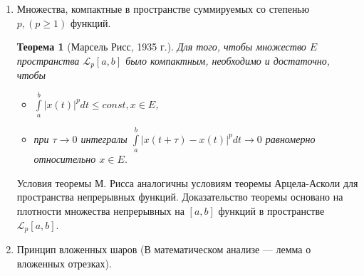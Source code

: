 \documentclass[12pt,a4paper,titlepage,oneside]{book}
\newcommand{\overbar}[1]{\mkern 1.5mu\overline{\mkern-1.5mu#1\mkern-1.5mu}\mkern 1.5mu}
\theoremstyle{definition}
\theoremstyle{plain}
\newtheorem*{theorem}{Теорема}
\theoremstyle{remark}
\theoremstyle{remark}
\theoremstyle{remark}
\theoremstyle{remark}
\theoremstyle{plain}
\theoremstyle{plain}
\begin{document}
\begin{enumerate}
\begin{proof}
	Покажем, что компактное множество $H_{\varepsilon}$ образует в $E$ $\varepsilon$-сеть. Для любой функции $x\in E$ построим ломаную $\overbar{x}(t)$, $\overbar{x} \in H_{\varepsilon}$. Так как $x(t)$ непрерывна, то на отрезке $[t_k, t_{k+1}]$ она достигает своего максимального значения $M_k$ и своего минимального значения $m_k$: $m_k \leqslant x(t) \leqslant M_k, t \in [t_k, t_{k+1}]$. В этих же пределах лежат и значения линейной функции $\overbar{x}(t)$. Ясно, что $|x(t)-\overbar{x}(t)|\leqslant M_k-m_k, t \in [t_k, t_{k+1}]$.
	
	В силу выбора значения $\delta$ величины $M_k-m_k < \varepsilon$. Тогда и $\rho(x, \overbar{x}) < \varepsilon$. Согласно следствию теоремы Хаусдорфа, множество $E$ компактно в $C[a, b]$.
	
	$\underbar {Необходимость}$ Свойства функций из компактного множества $E$, указанные в теореме, сразу следуют из существования в $E$ $\underbar {конечной}$ $\varepsilon$-сети непрерывных на $[a, b]$ функций $x_1(t), x_2(t),\ldots,x_N(t)$.
\end{proof}

	\item Множества, компактные в пространстве суммируемых со степенью $p, (p \geqslant 1)$ функций.

\begin{theorem} [Марсель Рисс, 1935 г.]
Для того, чтобы множество $E$  пространства $\mathcal{L}_p[a, b]$ было компактным, необходимо и достаточно, чтобы

\begin{itemize}

	\item $\int\limits_a^b |x(t)|^p dt \leqslant const, x \in E$,

	\item при $\tau \to 0$ интегралы $\int\limits_a^b |x(t+\tau)-x(t)|^p dt \to 0$ равномерно относительно $x \in E$.

\end{itemize}

\end{theorem}

Условия теоремы М. Рисса аналогичны условиям теоремы Арцела-Асколи для пространства непрерывных функций. Доказательство теоремы основано на плотности множества непрерывных на $[a, b]$ функций в пространстве $\mathcal{L}_p [a, b]$.

	\item Принцип вложенных шаров (В математическом анализе --- лемма о вложенных отрезках).


\end{enumerate}
\end{document}
